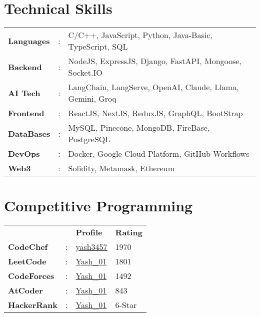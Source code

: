 \documentclass[letterpaper,11pt]{article}
\begin{document}
\begin{minipage}[t]{0.65\textwidth}
  \section{Technical Skills}
  \vspace{1pt}
  \begin{tabular}{>{\raggedright}p{2.1cm} p{0.3cm} p{9.8cm}}
    \textbf{\small{Languages}}  & : & \small{C/C++, JavaScript, Python, Java-Basic, TypeScript, SQL}     \\
    \textbf{\small{Backend}}    & : & \small{NodeJS, ExpressJS, Django, FastAPI, Mongoose, Socket.IO}    \\
    \textbf{\small{AI Tech}}    & : & \small{LangChain, LangServe, OpenAI, Claude, Llama, Gemini, Groq}  \\
    \textbf{\small{Frontend}}   & : & \small{ReactJS, NextJS, ReduxJS, GraphQL, BootStrap}               \\
    \textbf{\small{DataBases}}  & : & \small{MySQL, Pinecone, MongoDB, FireBase, PostgreSQL}             \\
    \textbf{\small{DevOps}}     & : & \small{Docker, Google Cloud Platform, GitHub Workflows}            \\
    \textbf{\small{Web3}}       & : & \small{Solidity, Metamask, Ethereum}                               \\
  \end{tabular}
\end{minipage}
\hfill
\begin{minipage}[t]{0.32\textwidth}
  \section{Competitive Programming}
  \raggedleft
  \renewcommand{\arraystretch}{1.1}
  \begin{tabular}{>{\raggedright}p{2.3cm} p{0.3cm} P{1.7cm} P{1.7cm}}
    {}                          & {} & \textbf{\small{Profile}}                                                & \textbf{\small{Rating}}  \\
    \textbf{\small{CodeChef}}   & :  & {\href{https://www.codechef.com/users/yash3457}{{\small{yash3457}}}}    & \small{1970}             \\
    \textbf{\small{LeetCode}}   & :  & {\href{https://leetcode.com/u/Yash_01/}{{\small{Yash\_01}}}}            & \small{1801}             \\
    \textbf{\small{CodeForces}} & :  & {\href{https://codeforces.com/profile/Yash_01}{{\small{Yash\_01}}}}     & \small{1492}             \\
    \textbf{\small{AtCoder}}    & :  & {\href{https://atcoder.jp/users/Yash_01}{{\small{Yash\_01}}}}           & \small{843}              \\
    \textbf{\small{HackerRank}} & :  & {\href{https://www.hackerrank.com/profile/Yash_01}{{\small{Yash\_01}}}} & \small{6-Star}           \\
  \end{tabular}
\end{minipage}
\end{document}
